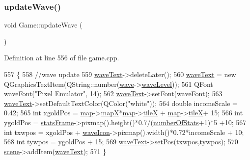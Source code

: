 \subsubsection{\texorpdfstring{update\+Wave()}{updateWave()}}
{\footnotesize\ttfamily void Game\+::update\+Wave (\begin{DoxyParamCaption}{ }\end{DoxyParamCaption})}



Definition at line 556 of file game.\+cpp.


\begin{DoxyCode}
557 \{
558     \textcolor{comment}{//wave update}
559     \hyperlink{class_game_ac33d078835536f2dc1af85ddbabd3a20}{waveText}->deleteLater();
560     \hyperlink{class_game_ac33d078835536f2dc1af85ddbabd3a20}{waveText} = \textcolor{keyword}{new} QGraphicsTextItem(QString::number(\hyperlink{class_game_af9a4b49ad573785e961b29758c84fdd0}{wave}->\hyperlink{class_waves_abfdc18a5f2f185285173797c1c67c6f9}{waveLevel}));
561     QFont waveFont(\textcolor{stringliteral}{"Pixel Emulator"}, 14);
562     \hyperlink{class_game_ac33d078835536f2dc1af85ddbabd3a20}{waveText}->setFont(waveFont);
563     \hyperlink{class_game_ac33d078835536f2dc1af85ddbabd3a20}{waveText}->setDefaultTextColor(QColor(\textcolor{stringliteral}{"white"}));
564     \textcolor{keywordtype}{double} incomeScale = 0.42;
565     \textcolor{keywordtype}{int} xgoldPos = \hyperlink{class_game_acef3a39fdf14be2c980b0dc11e7be402}{map}->\hyperlink{class_map_acfd20721da29a2e353598555e23e12f0}{mapX}*\hyperlink{class_game_acef3a39fdf14be2c980b0dc11e7be402}{map}->\hyperlink{class_map_af2aa425dd22aba483ae973c4a15fe934}{tileX} + \hyperlink{class_game_acef3a39fdf14be2c980b0dc11e7be402}{map}->\hyperlink{class_map_af2aa425dd22aba483ae973c4a15fe934}{tileX}+ 15;
566     \textcolor{keywordtype}{int} ygoldPos = \hyperlink{class_game_a3b40718d348c0f12af63a3f428924ab4}{statsFrame}->pixmap().height()*0.7/(\hyperlink{class_game_af041d097dc2350360c7951e5a41bc48a}{numberOfStats}+1)*5 +10;
567     \textcolor{keywordtype}{int} txwpos = xgoldPos + \hyperlink{class_game_ade75481ee579a63670f6d7358919634a}{waveIcon}->pixmap().width()*0.72*incomeScale + 10;
568     \textcolor{keywordtype}{int} tywpos = ygoldPos + 15;
569     \hyperlink{class_game_ac33d078835536f2dc1af85ddbabd3a20}{waveText}->setPos(txwpos,tywpos);
570     \hyperlink{class_game_a8119e3b9a632906c6808fa294b46a92a}{scene}->addItem(\hyperlink{class_game_ac33d078835536f2dc1af85ddbabd3a20}{waveText});
571 \}
\end{DoxyCode}
\mbox{\label{class_game_af310eb8cf154b512e2ae488267495c96}} 
